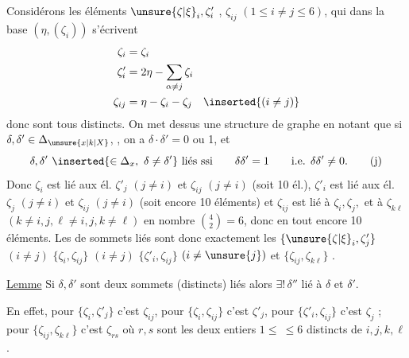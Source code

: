  Considérons les  éléments $\unsure{\zeta|\xi}_i,\zeta'_i$ , $\zeta_{ij}$ $(1\le i\ne j\le6)$, qui dans la base $(\eta,(\zeta_i))$ s'écrivent
\[
\begin{aligned}
\zeta_i&=\zeta_i\\
\zeta'_i&=2\eta-\sum_{\alpha\ne j}\zeta_i\\
\zeta_{ij}&=\eta-\zeta_i-\zeta_j\quad\inserted{(i\ne j)}
\end{aligned}
\]
donc sont tous distincts.  On met dessus une structure de graphe en notant  que si $\delta,\delta'\in\Delta_{\unsure{x|k|X}}$, , on a $\delta\cdot\delta'=0$ ou 1,  et  
\[
\delta,\delta'\ \inserted{\in\Delta_x,\ \delta\ne\delta'}\ \text{liés ssi}\qquad\delta\delta'=1\qquad\text{i.e. }\delta\delta'\ne0.\tag*{(j)}
\]
Donc $\zeta_i$ est lié aux él. $\zeta'_j$ $(j\ne i)$ et $\zeta_{ij}$ $(j\ne i)$  (soit 10 él.), $\zeta'_i$ est lié aux él. $\zeta_j$ $(j\ne i)$ et $\zeta_{ij}$ $(j\ne i)$  (soit encore 10 éléments) et $\zeta_{ij}$  est lié à $\zeta_i,\zeta_j,$  et à $\zeta_{k\ell}$ $(k\ne i,j,\ell\ne i,j,k\ne\ell)$ en nombre $\binom42=6$, donc en tout encore 10 éléments.  Les   de sommets liés sont donc
exactement les $\{\unsure{\zeta|\xi}_i,\zeta'_j\}$ $(i\ne j)$ $\{\zeta_i,\zeta_{ij}\}$ $(i\ne j)$ $\{\zeta'_i,\zeta_{ij}\}$ $(i\ne\unsure{j})$ et $\{\zeta_{ij},\zeta_{k\ell}\}$ . 

\uline{Lemme} Si $\delta,\delta'$ sont deux sommets (distincts) liés alors $\exists!\,\delta''$ lié à $\delta$ et $\delta'$.

En effet, pour $\{\zeta_i,\zeta'_j\}$ c'est $\zeta_{ij}$, pour $\{\zeta_i,\zeta_{ij}\}$ c'est $\zeta'_j$, pour $\{\zeta'_i,\zeta_{ij}\}$ c'est $\zeta_j$ ; pour $\{\zeta_{ij},\zeta_{k\ell}\}$ c'est $\zeta_{rs}$ où $r,s$ sont les deux entiers $1\le\ \le6$ distincts de $i,j,k,\ell$.

